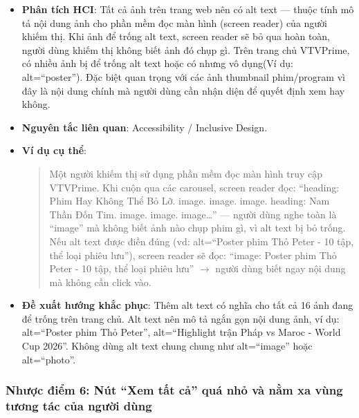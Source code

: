 \begin{itemize}
  \item \textbf{Phân tích HCI}: Tất cả ảnh trên trang web nên có alt text --- thuộc tính mô tả nội dung ảnh cho phần mềm đọc màn hình (screen reader) của người khiếm thị. Khi ảnh để trống alt text, screen reader sẽ bỏ qua hoàn toàn, người dùng khiếm thị không biết ảnh đó chụp gì. Trên trang chủ VTVPrime, có nhiều ảnh bị để trống alt text hoặc có nhưng vô dụng(Ví dụ: alt=``poster''). Đặc biệt quan trọng với các ảnh thumbnail phim/program vì đây là nội dung chính mà người dùng cần nhận diện để quyết định xem hay không.
  \item \textbf{Nguyên tắc liên quan}: Accessibility / Inclusive Design.
  \item \textbf{Ví dụ cụ thể}:
  \begin{quote}
    Một người khiếm thị sử dụng phần mềm đọc màn hình truy cập VTVPrime. Khi cuộn qua các carousel, screen reader đọc: ``heading: Phim Hay Không Thể Bỏ Lỡ. image. image. image. heading: Nam Thần Đốn Tim. image. image. image\ldots'' --- người dùng nghe toàn là ``image'' mà không biết ảnh nào chụp phim gì, vì alt text bị bỏ trống. Nếu alt text được điền đúng (vd: alt=``Poster phim Thỏ Peter - 10 tập, thể loại phiêu lưu''), screen reader sẽ đọc: ``image: Poster phim Thỏ Peter - 10 tập, thể loại phiêu lưu'' \ensuremath{\rightarrow} người dùng biết ngay nội dung mà không cần click vào.
  \end{quote}
  \item \textbf{Đề xuất hướng khắc phục}: Thêm alt text có nghĩa cho tất cả 16 ảnh đang để trống trên trang chủ. Alt text nên mô tả ngắn gọn nội dung ảnh, ví dụ: alt=``Poster phim Thỏ Peter'', alt=``Highlight trận Pháp vs Maroc - World Cup 2026''. Không dùng alt text chung chung như alt=``image'' hoặc alt=``photo''.
\end{itemize}

\subsubsection{Nhược điểm 6: Nút ``Xem tất cả'' quá nhỏ và nằm xa vùng tương tác của người dùng}

